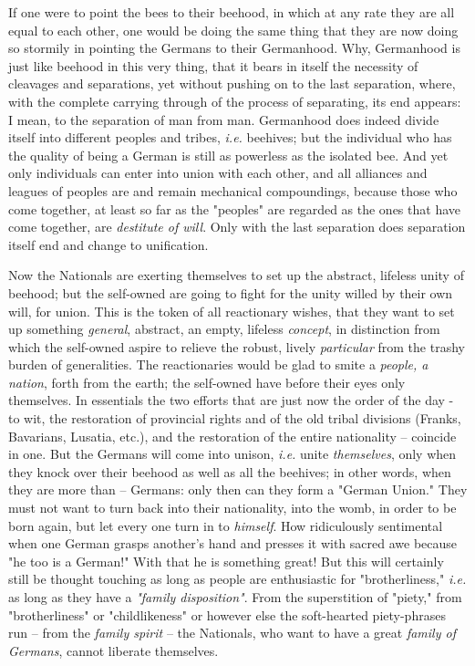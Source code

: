 If one were to point the bees to their beehood, in which at any rate they are 
all equal to each other, one would be doing the same thing that they are now 
doing so stormily in pointing the Germans to their Germanhood. Why, Germanhood 
is just like beehood in this very thing, that it bears in itself the necessity 
of cleavages and separations, yet without pushing on to the last separation, 
where, with the complete carrying through of the process of separating, its 
end appears: I mean, to the separation of man from man. Germanhood does indeed 
divide itself into different peoples and tribes, \textit{i.e.} beehives; but 
the individual who has the quality of being a German is still as powerless as 
the isolated bee. And yet only individuals can enter into union with each 
other, and all alliances and leagues of peoples are and remain mechanical 
compoundings, because those who come together, at least so far as the 
"{}peoples"{} are regarded as the ones that have come together, are 
\textit{destitute of will}. Only with the last separation does separation 
itself end and change to unification.

Now the Nationals are exerting themselves to set up the abstract, lifeless 
unity of beehood; but the self-owned are going to fight for the unity willed 
by their own will, for union. This is the token of all reactionary wishes, 
that they want to set up something \textit{general}, abstract, an empty, 
lifeless \textit{concept}, in distinction from which the self-owned aspire to 
relieve the robust, lively \textit{particular} from the trashy burden of 
generalities. The reactionaries would be glad to smite a \textit{people, a 
nation}, forth from the earth; the self-owned have before their eyes only 
themselves. In essentials the two efforts that are just now the order of the 
day - to wit, the restoration of provincial rights and of the old tribal 
divisions (Franks, Bavarians, Lusatia, etc.), and the restoration of the 
entire nationality -- coincide in one. But the Germans will come into unison, 
\textit{i.e.} unite \textit{themselves}, only when they knock over their 
beehood as well as all the beehives; in other words, when they are more than 
-- Germans: only then can they form a "{}German Union."{} They must not want 
to turn back into their nationality, into the womb, in order to be born again, 
but let every one turn in to \textit{himself}. How ridiculously sentimental 
when one German grasps another's hand and presses it with sacred awe because 
"{}he too is a German!"{} With that he is something great! But this will 
certainly still be thought touching as long as people are enthusiastic for 
"{}brotherliness,"{} \textit{i.e.} as long as they have a \textit{"{}family 
disposition"{}}. From the superstition of "{}piety,"{} from 
"{}brotherliness"{} or "{}childlikeness"{} or however else the soft-hearted 
piety-phrases run -- from the \textit{family spirit} -- the Nationals, who 
want to have a great \textit{family of Germans}, cannot liberate themselves.

